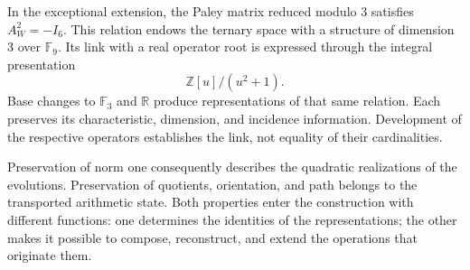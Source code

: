 In the exceptional extension, the Paley matrix reduced modulo \(3\)
satisfies \(A_W^2=-I_6\). This relation endows the ternary space with a
structure of dimension \(3\) over \(\mathbb F_9\). Its link with a real
operator root is expressed through the integral presentation
\[
 \mathbb Z[u]/(u^2+1).
\]
Base changes to \(\mathbb F_3\) and \(\mathbb R\) produce
representations of that same relation. Each preserves its characteristic,
dimension, and incidence information. Development of the
respective operators establishes the link, not equality of their
cardinalities.

Preservation of norm one consequently describes the quadratic
realizations of the evolutions. Preservation of quotients, orientation, and
path belongs to the transported arithmetic state. Both properties
enter the construction with different functions: one determines the
identities of the representations; the other makes it possible to compose, reconstruct, and
extend the operations that originate them.
